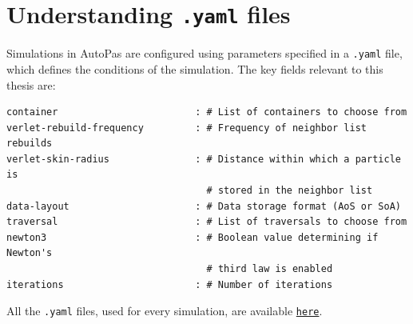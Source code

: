 \section{Understanding \texttt{.yaml} files} \label{app:yaml}
Simulations in AutoPas are configured using parameters specified in a \texttt{.yaml} file, which defines the conditions of the simulation. The key fields relevant to this thesis are:

\begin{verbatim}
container                        : # List of containers to choose from
verlet-rebuild-frequency         : # Frequency of neighbor list rebuilds
verlet-skin-radius               : # Distance within which a particle is 
                                   # stored in the neighbor list
data-layout                      : # Data storage format (AoS or SoA)
traversal                        : # List of traversals to choose from
newton3                          : # Boolean value determining if Newton's 
                                   # third law is enabled
iterations                       : # Number of iterations
\end{verbatim}

All the \texttt{.yaml} files, used for every simulation, are available \href{https://github.com/xhulia028/GraphView}{\texttt{here}}.


